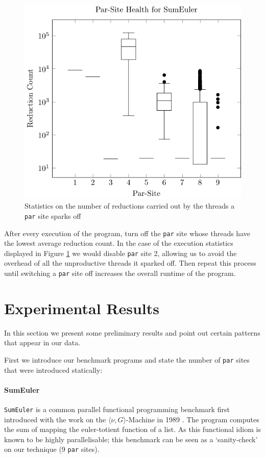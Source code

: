 \begin{figure}
  \includegraphics[width=\linewidth]{Informed/Figures/threadhealth.pdf}
\caption{Statistics on the number of reductions carried out by the threads a
\texttt{par} site sparks off}
\label{sumHist}
\end{figure}

After every execution of the program, turn off the \verb'par' site whose threads
have the lowest average reduction count. In the case of the execution statistics
displayed in Figure \ref{sumHist} we would disable \verb-par- site 2, allowing
us to avoid the overhead of all the unproductive threads it sparked off.  Then
repeat this process until switching a \verb'par' site off increases the overall
runtime of the program.

\section{Experimental Results}
\label{sec:results}

In this section we present some preliminary results and point out certain patterns
that appear in our data. 

First we introduce our benchmark programs and state the number of \verb-par-
sites that were introduced statically:

\paragraph{SumEuler}
\texttt{SumEuler} is a common parallel functional programming benchmark first introduced
with the work on the $\langle\nu, G\rangle$-Machine in 1989 \citep{vGMachine}.
The program computes the sum of mapping the euler-totient function of a list. As
this functional idiom is known to be highly parallelisable; this benchmark can
be seen as a `sanity-check' on our technique (9 \verb-par- sites).

